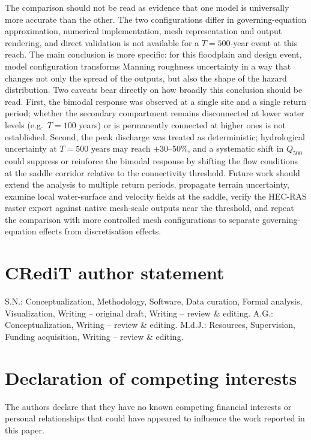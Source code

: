 \documentclass[a4paper,fleqn]{cas-sc}
\begin{document}
The comparison should not be read as evidence that one model is universally more accurate than the other. The two configurations differ in governing-equation approximation, numerical implementation, mesh representation and output rendering, and direct validation is not available for a $T=500$-year event at this reach. The main conclusion is more specific: for this floodplain and design event, model configuration transforms Manning roughness uncertainty in a way that changes not only the spread of the outputs, but also the shape of the hazard distribution. Two caveats bear directly on how broadly this conclusion should be read. First, the bimodal response was observed at a single site and a single return period; whether the secondary compartment remains disconnected at lower water levels (e.g.\ $T=100$ years) or is permanently connected at higher ones is not established. Second, the peak discharge was treated as deterministic; hydrological uncertainty at $T=500$ years may reach $\pm30$--50\%, and a systematic shift in $Q_{500}$ could suppress or reinforce the bimodal response by shifting the flow conditions at the saddle corridor relative to the connectivity threshold. Future work should extend the analysis to multiple return periods, propagate terrain uncertainty, examine local water-surface and velocity fields at the saddle, verify the HEC-RAS raster export against native mesh-scale outputs near the threshold, and repeat the comparison with more controlled mesh configurations to separate governing-equation effects from discretisation effects.


\section*{CRediT author statement}

S.N.: Conceptualization, Methodology, Software, Data curation, Formal analysis,
Visualization, Writing -- original draft, Writing -- review \& editing.
A.G.: Conceptualization, Writing -- review \& editing.
M.d.J.: Resources, Supervision, Funding acquisition, Writing -- review \& editing.

\section*{Declaration of competing interests}
The authors declare that they have no known competing financial interests or personal relationships that could have appeared to influence the work reported in this paper.
\end{document}
